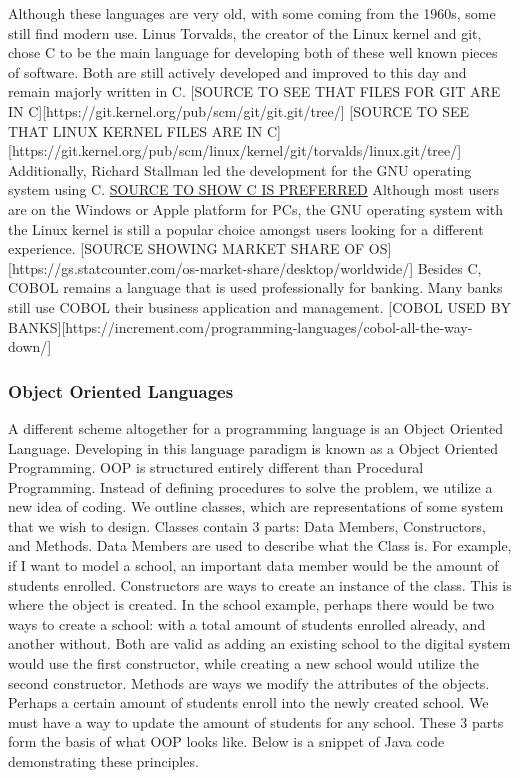 Although these languages are very old, with some coming from the 1960s, some still find modern use.
Linus Torvalds, the creator of the Linux kernel and git, chose C to be the main language for developing both of these well known pieces of software.
Both are still actively developed and improved to this day and remain majorly written in C.
[SOURCE TO SEE THAT FILES FOR GIT ARE IN C][https://git.kernel.org/pub/scm/git/git.git/tree/]
[SOURCE TO SEE THAT LINUX KERNEL FILES ARE IN C][https://git.kernel.org/pub/scm/linux/kernel/git/torvalds/linux.git/tree/]
Additionally, Richard Stallman led the development for the GNU operating system using C.
\href{https://www.gnu.org/prep/standards/html_node/Source-Language.html}{SOURCE TO SHOW C IS PREFERRED}
Although most users are on the Windows or Apple platform for PCs, the GNU operating system with the Linux kernel is still a popular choice amongst users looking for a different experience.
[SOURCE SHOWING MARKET SHARE OF OS][https://gs.statcounter.com/os-market-share/desktop/worldwide/]
Besides C, COBOL remains a language that is used professionally for banking.
Many banks still use COBOL their business application and management.
[COBOL USED BY BANKS][https://increment.com/programming-languages/cobol-all-the-way-down/]

\subsubsection{Object Oriented Languages}\label{subsubsec:OOPL}

A different scheme altogether for a programming language is an Object Oriented Language.
Developing in this language paradigm is known as a Object Oriented Programming.
OOP is structured entirely different than Procedural Programming.
Instead of defining procedures to solve the problem, we utilize a new idea of coding.
We outline classes, which are representations of some system that we wish to design.
Classes contain 3 parts: Data Members, Constructors, and Methods.
Data Members are used to describe what the Class is.
For example, if I want to model a school, an important data member would be the amount of students enrolled.
Constructors are ways to create an instance of the class.
This is where the object is created.
In the school example, perhaps there would be two ways to create a school: with a total amount of students enrolled already, and another without.
Both are valid as adding an existing school to the digital system would use the first constructor, while creating a new school would utilize the second constructor.
Methods are ways we modify the attributes of the objects.
Perhaps a certain amount of students enroll into the newly created school.
We must have a way to update the amount of students for any school.
These 3 parts form the basis of what OOP looks like.
Below is a snippet of Java code demonstrating these principles.

